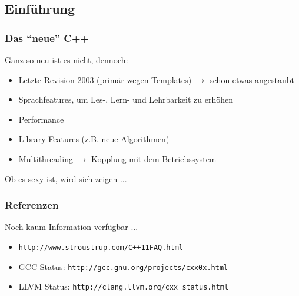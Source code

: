 \subsection{Einführung}

\begin{frame}
  \frametitle{Das ``neue'' C++}

  Ganz so neu ist es nicht, dennoch:

  \begin{itemize}
  \item Letzte Revision 2003 (primär wegen Templates) $\rightarrow$
    schon etwas angestaubt
  \item Sprachfeatures, um Les-, Lern- und Lehrbarkeit zu erhöhen
  \item Performance
  \item Library-Features (z.B. neue Algorithmen)
  \item Multithreading $\rightarrow$ Kopplung mit dem Betriebssystem
  \end{itemize}

  Ob es sexy ist, wird sich zeigen ...

\end{frame}

\begin{frame}
  \frametitle{Referenzen}

  Noch kaum Information verfügbar ...

  \begin{itemize}
  \item \texttt{http://www.stroustrup.com/C++11FAQ.html}
  \item GCC Status: \texttt{http://gcc.gnu.org/projects/cxx0x.html}
  \item LLVM Status: \texttt{http://clang.llvm.org/cxx\_status.html}
  \end{itemize}

\end{frame}

